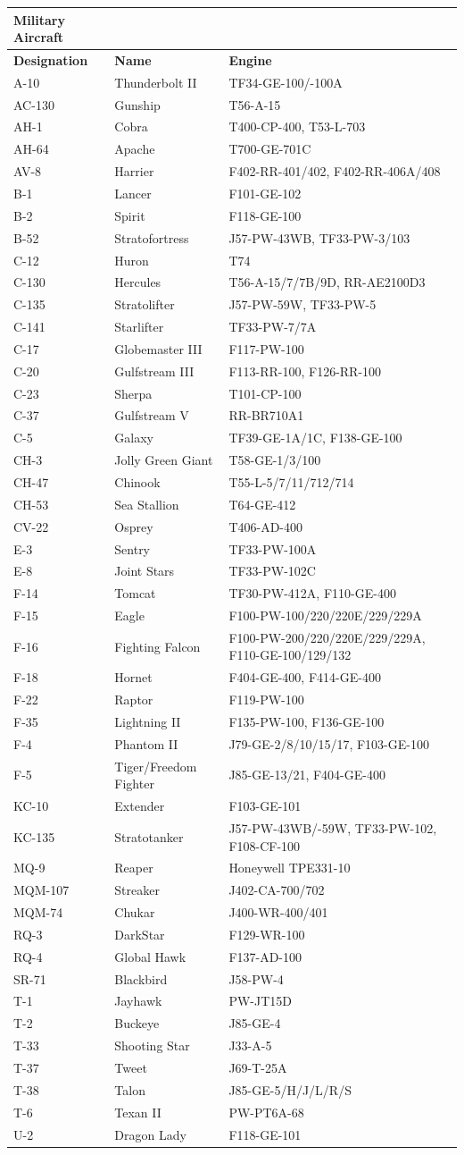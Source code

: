 \documentclass[
]{book}
\begin{document}
\begin{longtable}[]{@{}lll@{}}
\toprule
\textbf{Military Aircraft} & &\tabularnewline
\midrule
\endhead
\textbf{Designation} & \textbf{Name} & \textbf{Engine}\tabularnewline
A-10 & Thunderbolt II & TF34-GE-100/-100A\tabularnewline
AC-130 & Gunship & T56-A-15\tabularnewline
AH-1 & Cobra & T400-CP-400, T53-L-703\tabularnewline
AH-64 & Apache & T700-GE-701C\tabularnewline
AV-8 & Harrier & F402-RR-401/402, F402-RR-406A/408\tabularnewline
B-1 & Lancer & F101-GE-102\tabularnewline
B-2 & Spirit & F118-GE-100\tabularnewline
B-52 & Stratofortress & J57-PW-43WB, TF33-PW-3/103\tabularnewline
C-12 & Huron & T74\tabularnewline
C-130 & Hercules & T56-A-15/7/7B/9D, RR-AE2100D3\tabularnewline
C-135 & Stratolifter & J57-PW-59W, TF33-PW-5\tabularnewline
C-141 & Starlifter & TF33-PW-7/7A\tabularnewline
C-17 & Globemaster III & F117-PW-100\tabularnewline
C-20 & Gulfstream III & F113-RR-100, F126-RR-100\tabularnewline
C-23 & Sherpa & T101-CP-100\tabularnewline
C-37 & Gulfstream V & RR-BR710A1\tabularnewline
C-5 & Galaxy & TF39-GE-1A/1C, F138-GE-100\tabularnewline
CH-3 & Jolly Green Giant & T58-GE-1/3/100\tabularnewline
CH-47 & Chinook & T55-L-5/7/11/712/714\tabularnewline
CH-53 & Sea Stallion & T64-GE-412\tabularnewline
CV-22 & Osprey & T406-AD-400\tabularnewline
E-3 & Sentry & TF33-PW-100A\tabularnewline
E-8 & Joint Stars & TF33-PW-102C\tabularnewline
F-14 & Tomcat & TF30-PW-412A, F110-GE-400\tabularnewline
F-15 & Eagle & F100-PW-100/220/220E/229/229A\tabularnewline
F-16 & Fighting Falcon & F100-PW-200/220/220E/229/229A, F110-GE-100/129/132\tabularnewline
F-18 & Hornet & F404-GE-400, F414-GE-400\tabularnewline
F-22 & Raptor & F119-PW-100\tabularnewline
F-35 & Lightning II & F135-PW-100, F136-GE-100\tabularnewline
F-4 & Phantom II & J79-GE-2/8/10/15/17, F103-GE-100\tabularnewline
F-5 & Tiger/Freedom Fighter & J85-GE-13/21, F404-GE-400\tabularnewline
KC-10 & Extender & F103-GE-101\tabularnewline
KC-135 & Stratotanker & J57-PW-43WB/-59W, TF33-PW-102, F108-CF-100\tabularnewline
MQ-9 & Reaper & Honeywell TPE331-10\tabularnewline
MQM-107 & Streaker & J402-CA-700/702\tabularnewline
MQM-74 & Chukar & J400-WR-400/401\tabularnewline
RQ-3 & DarkStar & F129-WR-100\tabularnewline
RQ-4 & Global Hawk & F137-AD-100\tabularnewline
SR-71 & Blackbird & J58-PW-4\tabularnewline
T-1 & Jayhawk & PW-JT15D\tabularnewline
T-2 & Buckeye & J85-GE-4\tabularnewline
T-33 & Shooting Star & J33-A-5\tabularnewline
T-37 & Tweet & J69-T-25A\tabularnewline
T-38 & Talon & J85-GE-5/H/J/L/R/S\tabularnewline
T-6 & Texan II & PW-PT6A-68\tabularnewline
U-2 & Dragon Lady & F118-GE-101\tabularnewline

\end{longtable}
\end{document}
